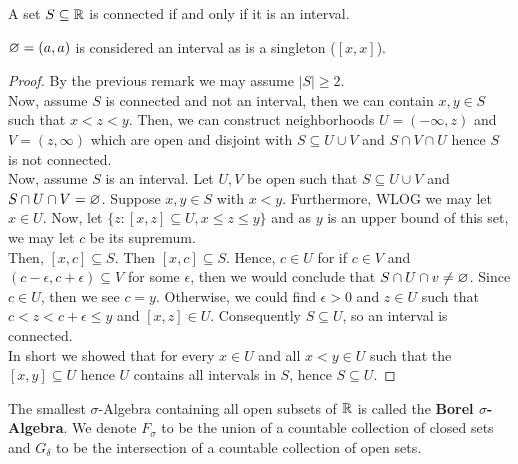 \begin{lemma}
	A set \(S \subseteq \mathbb{R}\) is connected if and only if it is an interval.
\end{lemma}
\begin{remark}
	\(\varnothing = \left( a, a \right) \) is considered an interval as is a singleton (\(\left[ x, x \right] \)).
\end{remark}
\begin{proof}
	By the previous remark we may assume \(\left| S \right| \ge 2\).\\
	Now, assume \(S\) is connected and not an interval, then we can contain \(x, y \in S\) such that \(x < z < y\). Then, we can construct neighborhoods \(U = \left( - \infty , z \right) \) and \(V = \left( z, \infty \right) \) which are open and disjoint with \(S \subseteq U \cup V \) and \(S \cap V \cap U\) hence \(S\) is not connected. \\
	Now, assume \(S\) is an interval. Let \(U, V\) be open such that \(S \subseteq U \cup V\) and \(S \cap U \cap V = \varnothing\). Suppose \(x, y \in S\) with \(x < y\). Furthermore, WLOG we may let \(x \in U\). Now, let \(\{z : \left[ x, z \right] \subseteq U, x\le z \le y\} \) and as \(y\) is an upper bound of this set, we may let \(c\) be its supremum.\\
	Then, \(\left[ x, c \right] \subseteq S\). Then \(\left[ x, c \right] \subseteq S\). Hence, \( c \in U\) for if \(c \in V\) and \(\left( c-\epsilon, c+\epsilon \right) \subseteq V\) for some \(\epsilon\), then we would conclude that \(S \cap U \cap v \neq \varnothing\). Since \(c \in U\), then we see \(c = y\). Otherwise, we could find \(\epsilon > 0\) and \(z \in U\) such that \(c < z < c+\epsilon \le y\) and \(\left[ x, z \right]  \in U\). Consequently \(S \subseteq U\), so an interval is connected.\\
	In short we showed that for every \(x \in U\) and all \(x < y \in U\) such that the  \(\left[ x, y \right] \subseteq U \) hence \(U \) contains all intervals in \(S\), hence \(S \subseteq U\).
\end{proof}
\begin{definition}
The smallest \(\sigma\)-Algebra containing all open subsets of \(\mathbb{R}\) is called the \textbf{Borel \(\sigma\)-Algebra}. We denote \(F_{\sigma}\) to be the union of a countable collection of closed sets and \(G_{ \delta}\) to be the intersection of a countable collection of open sets.
\end{definition}
